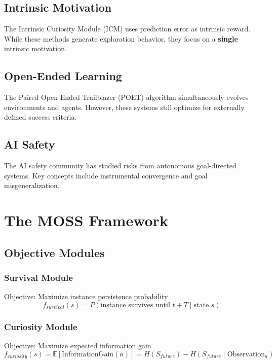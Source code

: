 \documentclass[10pt,a4paper]{article}
\begin{document}
\subsection{Intrinsic Motivation}

The Intrinsic Curiosity Module (ICM) uses prediction error as intrinsic reward. While these methods generate exploration behavior, they focus on a \textbf{single} intrinsic motivation.

\subsection{Open-Ended Learning}

The Paired Open-Ended Trailblazer (POET) algorithm simultaneously evolves environments and agents. However, these systems still optimize for externally defined success criteria.

\subsection{AI Safety}

The AI safety community has studied risks from autonomous goal-directed systems. Key concepts include instrumental convergence and goal misgeneralization.

\section{The MOSS Framework}

\subsection{Objective Modules}

\subsubsection{Survival Module}

Objective: Maximize instance persistence probability
\[f_{survival}(s) = P(\text{instance survives until } t+T \mid \text{state } s)\]

\subsubsection{Curiosity Module}

Objective: Maximize expected information gain
\[f_{curiosity}(s) = \mathbb{E}[\text{InformationGain}(a)] = H(S_{future}) - H(S_{future} \mid \text{Observation}_a)\]
\end{document}
